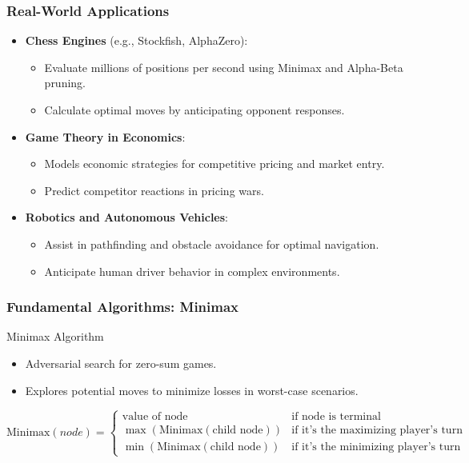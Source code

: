\documentclass[aspectratio=169]{beamer}
\begin{document}
\begin{frame}[fragile]
    \frametitle{Real-World Applications}
    \begin{itemize}
        \item \textbf{Chess Engines} (e.g., Stockfish, AlphaZero):
            \begin{itemize}
                \item Evaluate millions of positions per second using Minimax and Alpha-Beta pruning.
                \item Calculate optimal moves by anticipating opponent responses.
            \end{itemize}
        \item \textbf{Game Theory in Economics}:
            \begin{itemize}
                \item Models economic strategies for competitive pricing and market entry.
                \item Predict competitor reactions in pricing wars.
            \end{itemize}
        \item \textbf{Robotics and Autonomous Vehicles}:
            \begin{itemize}
                \item Assist in pathfinding and obstacle avoidance for optimal navigation.
                \item Anticipate human driver behavior in complex environments.
            \end{itemize}
    \end{itemize}
\end{frame}

\begin{frame}[fragile]
    \frametitle{Fundamental Algorithms: Minimax}
    \begin{block}{Minimax Algorithm}
        \begin{itemize}
            \item Adversarial search for zero-sum games.
            \item Explores potential moves to minimize losses in worst-case scenarios.
        \end{itemize}
        \begin{equation}
        \text{Minimax}(node) = 
        \begin{cases} 
        \text{value of node} & \text{if node is terminal} \\ 
        \max(\text{Minimax}(\text{child node})) & \text{if it’s the maximizing player's turn} \\ 
        \min(\text{Minimax}(\text{child node})) & \text{if it’s the minimizing player's turn} 
        \end{cases}
        \end{equation}
    \end{block}
\end{frame}
\end{document}
